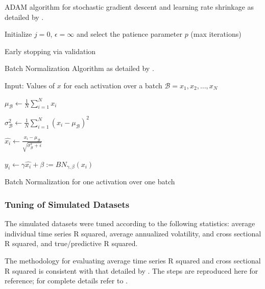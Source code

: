 \documentclass[11pt, a4paper, table]{article}
\begin{document}
ADAM algorithm for stochastic gradient descent and learning rate shrinkage as detailed by \cite{kingma_adam:_2014}.

\begin{algorithm}
	\SetAlgoLined
	Initialize $j = 0$, $\epsilon = \infty$ and select the patience parameter $p$ (max iterations)\
	
	\caption{Early stopping via validation}
\end{algorithm}

Batch Normalization Algorithm as detailed by \cite{ioffe_batch_2015}.

\begin{algorithm}
	Input: Values of \(x\) for each activation over a batch \(\mathcal{B} = {x_1, x_2, \dots, x_N}\)
	
	\(\mu_\mathcal{B} \leftarrow \frac{1}{N} \sum_{i = 1}^{N}x_i\)
	
	\(\sigma_\mathcal{B}^2 \leftarrow \frac{1}{N} \sum_{i = 1}^{N}(x_i - \mu_\mathcal{B})^2\)
	
	\(\hat{x_i} \leftarrow \frac{x_i - \mu_\mathcal{B}}{\sqrt{\sigma_\mathcal{B}^2 + \epsilon}}\)
	
	\(y_i \leftarrow \gamma\hat{x_i} + \beta := BN_{\gamma, \beta}(x_i)\)
	
	\caption{Batch Normalization for one activation over one batch}
\end{algorithm}

\subsubsection{Tuning of Simulated Datasets}

The simulated datasets were tuned according to the following statistics: average individual time series R squared, average annualized volatility, and cross sectional R squared, and true/predictive R squared.

The methodology for evaluating average time series R squared and cross sectional R squared is consistent with that detailed by \cite{cochrane_asset_2005}. The steps are reproduced here for reference; for complete details refer to \cite{cochrane_asset_2005}.
\end{document}
